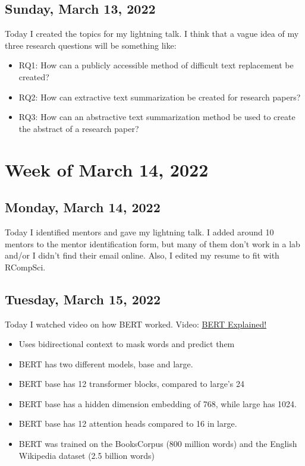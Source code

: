\documentclass[11pt,letterpaper]{article}
\begin{document}
\subsection{Sunday, March 13, 2022}
Today I created the topics for my lightning talk. I think that a vague idea of my three research questions will be something like:

\begin{itemize}
    \item RQ1: How can a publicly accessible method of difficult text replacement be created?
    \item RQ2: How can extractive text summarization be created for research papers?
    \item RQ3: How can an abstractive text summarization method be used to create the abstract of a research paper?
\end{itemize}


\section{Week of March 14, 2022}
\subsection{Monday, March 14, 2022}
Today I identified mentors and gave my lightning talk. I added around 10 mentors to the mentor identification form, but many of them don't work in a lab and/or I didn't find their email online. Also, I edited my resume to fit with RCompSci.

\subsection{Tuesday, March 15, 2022}
Today I watched video on how BERT worked. Video: \href{https://www.youtube.com/watch?v=OR0wfP2FD3c}{BERT Explained!
} 

\begin{itemize}
    \item Uses bidirectional context to mask words and predict them
    \item BERT has two different models, base and large. 
    \item BERT base has 12 transformer blocks, compared to large's 24
    \item BERT base has a hidden dimension embedding of 768, while large has 1024.
    \item BERT base has 12 attention heads compared to 16 in large. 
    \item BERT was trained on the BooksCorpus (800 million words) and the English Wikipedia dataset (2.5 billion words)
\end{itemize}
\end{document}

